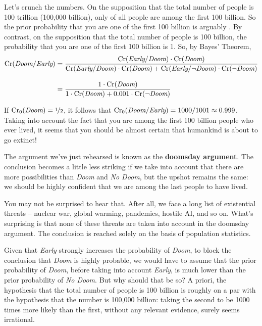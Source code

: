 Let's crunch the numbers. On the supposition that the total number of
people is 100 trillion (100,000 billion), only  of
all people are among the first 100 billion. So the prior probability
that you are one of the first 100 billion is arguably
. By contrast, on the supposition that the total
number of people is 100 billion, the probability that you are one of
the first 100 billion is 1. So, by Bayes' Theorem,
\begin{align*}
  \text{Cr}(\emph{Doom}/\emph{Early}) &= \frac{\text{Cr}(\emph{Early}/\emph{Doom}) \cdot \text{Cr}(\emph{Doom})}{\text{Cr}(\emph{Early}/\emph{Doom}) \cdot \text{Cr}(\emph{Doom}) + \text{Cr}(\emph{Early}/\neg\emph{Doom}) \cdot \text{Cr}(\neg \emph{Doom})}\\[3mm]
    &= \frac{1 \cdot \text{Cr}(\emph{Doom})}{1 \cdot \text{Cr}(\emph{Doom}) + 0.001 \cdot \text{Cr}(\neg\emph{Doom})}
\end{align*}

\smallskip 

If $\text{Cr}_0(\emph{Doom}) = \nicefrac{1}{2}$, it follows that
$\text{Cr}_0(\emph{Doom}/\emph{Early}) = 1000/1001 \approx 0.999$. Taking into
account the fact that you are among the first 100 billion people who
ever lived, it seems that you should be almost certain that humankind is
about to go extinct!

The argument we've just rehearsed is known as the \textbf{doomsday
  argument}. The conclusion becomes a little less striking if we take
into account that there are more possibilities than \emph{Doom} and
\emph{No Doom}, but the upshot remains the same: we should be highly
confident that we are among the last people to have lived.

You may not be surprised to hear that. After all, we face a long list
of existential threats -- nuclear war, global warming,
pandemics, hostile AI, and so on. What's surprising is that none of
these threats are taken into account in the doomsday argument. The
conclusion is reached solely on the basis of population statistics.

Given that \emph{Early} strongly increases the probability of
\emph{Doom}, to block the conclusion that \emph{Doom} is highly
probable, we would have to assume that the prior probability of
\emph{Doom}, before taking into account \emph{Early}, is much lower
than the prior probability of \emph{No Doom}. But why should that be
so? A priori, the hypothesis that the total number of people is 100
billion is roughly on a par with the hypothesis that the number is
100,000 billion: taking the second to be 1000 times more likely than
the first, without any relevant evidence, surely seems irrational.

